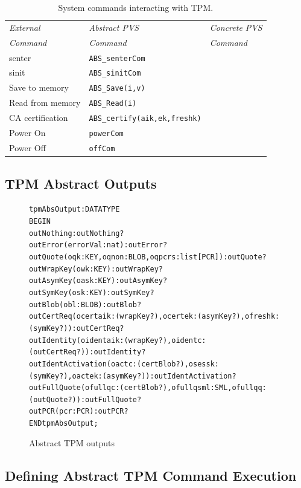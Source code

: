 \documentclass[10pt]{article}
\begin{document}
\begin{table}[hbtp]
  \centering
  \begin{tabular}{lll}
    \hline
    \emph{External}& \emph{Abstract PVS} & \emph{Concrete PVS} \\
    \emph{Command} & \emph{Command} & \emph{Command} \\ \hline
    \textsf{senter} & \verb+ABS_senterCom+ & \\
    \textsf{sinit} & \verb+ABS_sinitCom+ & \\
    Save to memory & \verb+ABS_Save(i,v)+ & \\
    Read from memory & \verb+ABS_Read(i)+ & \\
    CA certification & \verb+ABS_certify(aik,ek,freshk)+ & \\
    Power On & \verb+powerCom+ & \\
    Power Off  & \verb+offCom+ & \\
    \hline
  \end{tabular}
  \caption{System commands interacting with TPM.}
  \label{tab:commands-to-pvs}
\end{table}

\subsection{TPM Abstract Outputs}

\begin{figure}[hbtp]
  \begin{footnotesize}
  \begin{alltt}
  tpmAbsOutput : DATATYPE
  BEGIN
    outNothing : outNothing?
    outError(errorVal:nat) : outError?
    outQuote(oqk:KEY,oqnon:BLOB,oqpcrs:list[PCR]) : outQuote?
    outWrapKey(owk:KEY) : outWrapKey?
    outAsymKey(oask:KEY) : outAsymKey?
    outSymKey(osk:KEY) : outSymKey?
    outBlob(obl:BLOB) : outBlob?
    outCertReq(ocertaik:(wrapKey?),ocertek:(asymKey?),ofreshk:(symKey?)) : outCertReq?
    outIdentity(oidentaik:(wrapKey?),oidentc:(outCertReq?)) : outIdentity?
    outIdentActivation(oactc:(certBlob?),osessk:(symKey?),oactek:(asymKey?)) : outIdentActivation?
    outFullQuote(ofullqc:(certBlob?),ofullqsml:SML,ofullqq:(outQuote?)) : outFullQuote?
    outPCR(pcr:PCR) : outPCR?
  END tpmAbsOutput;
  \end{alltt}
  \end{footnotesize}
  \caption{Abstract TPM outputs}
  \label{fig:tpm-abs-output}
\end{figure}

\subsection{Defining Abstract TPM Command Execution}
\end{document}
